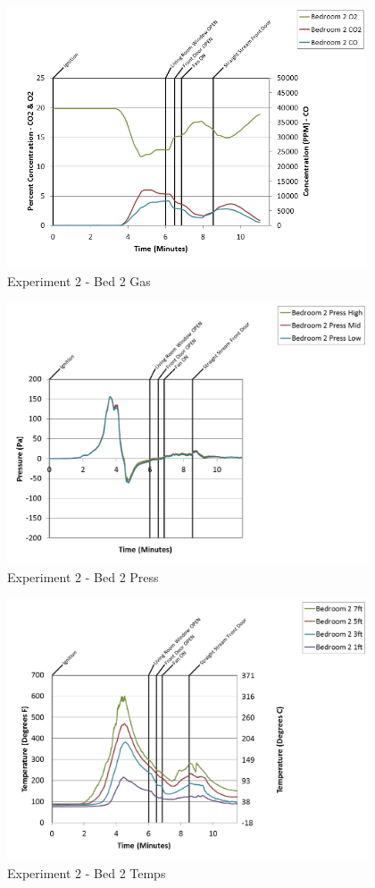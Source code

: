 \documentclass{article}
\begin{document}
\begin{appendices}
\clearpage

\begin{figure}[h!]
	\centering
	\includegraphics[height=3.05in]{0_Images/Results_Charts/Exp_2_Charts/Bed2Gas.png}
	\caption{Experiment 2 - Bed 2 Gas}
\end{figure}


\begin{figure}[h!]
	\centering
	\includegraphics[height=3.05in]{0_Images/Results_Charts/Exp_2_Charts/Bed2Press.png}
	\caption{Experiment 2 - Bed 2 Press}
\end{figure}

\clearpage

\begin{figure}[h!]
	\centering
	\includegraphics[height=3.05in]{0_Images/Results_Charts/Exp_2_Charts/Bed2Temps.png}
	\caption{Experiment 2 - Bed 2 Temps}
\end{figure}



\end{appendices}
\end{document}
